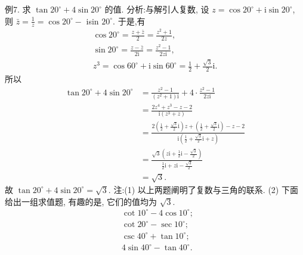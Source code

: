 例7. 求 $\tan 20^{\circ}+4 \sin 20^{\circ}$ 的值.
分析:与解引人复数, 设 $z=\cos 20^{\circ}+\mathrm{i} \sin 20^{\circ}$, 则 $\bar{z}=\frac{1}{z}=\cos 20^{\circ}-$ isin $20^{\circ}$. 于是,有
$$
\begin{gathered}
\cos 20^{\circ}=\frac{z+\bar{z}}{2}=\frac{z^2+1}{2 z}, \\
\sin 20^{\circ}=\frac{z-\bar{z}}{2 \mathrm{i}}=\frac{z^2-1}{2 z \mathrm{i}}, \\
z^3=\cos 60^{\circ}+\mathrm{i} \sin 60^{\circ}=\frac{1}{2}+\frac{\sqrt{3}}{2} \mathrm{i} .
\end{gathered}
$$
所以
$$
\begin{aligned}
\tan 20^{\circ}+4 \sin 20^{\circ} & =\frac{z^2-1}{\left(z^2+1\right) \mathrm{i}}+4 \cdot \frac{z^2-1}{2 z \mathrm{i}} \\
& =\frac{2 z^4+z^3-z-2}{\mathrm{i}\left(z^3+z\right)} \\
& =\frac{2\left(\frac{1}{2}+\frac{\sqrt{3}}{2} \mathrm{i}\right) z+\left(\frac{1}{2}+\frac{\sqrt{3}}{2} \mathrm{i}\right)-z-2}{\mathrm{i}\left(\frac{1}{2}+\frac{\sqrt{3}}{2} \mathrm{i}+z\right)} \\
& =\frac{\sqrt{3}\left(z \mathrm{i}+\frac{1}{2} \mathrm{i}-\frac{\sqrt{3}}{2}\right)}{\frac{1}{2} \mathrm{i}+z \mathrm{i}-\frac{\sqrt{3}}{2}} \\
& =\sqrt{3} .
\end{aligned}
$$
故 $\tan 20^{\circ}+4 \sin 20^{\circ}=\sqrt{3}$.
注:(1) 以上两题阐明了复数与三角的联系.
(2) 下面给出一组求值题, 有趣的是, 它们的值均为 $\sqrt{3}$.
$$
\begin{aligned}
& \cot 10^{\circ}-4 \cos 10^{\circ} ; \\
& \cot 20^{\circ}-\sec 10^{\circ} ; \\
& \csc 40^{\circ}+\tan 10^{\circ} ; \\
& 4 \sin 40^{\circ}-\tan 40^{\circ} \text {. }
\end{aligned}
$$



